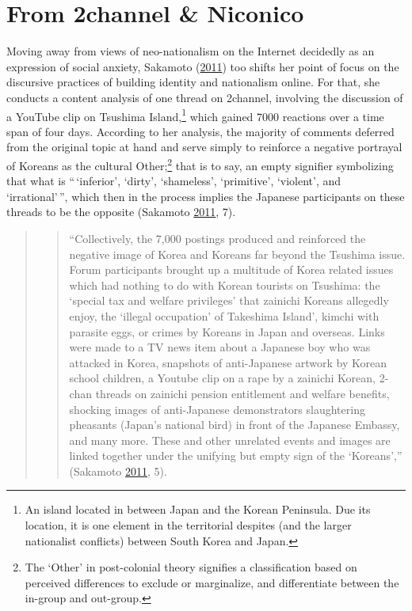 \documentclass[10pt,british,A4paper,,openany]{memoir}
\begin{document}
\section{From 2channel \& Niconico}\label{from-2channel-niconico}

Moving away from views of neo-nationalism on the Internet decidedly as
an expression of social anxiety, Sakamoto
(\protect\hyperlink{ref-sakamoto_koreans_2011}{2011}) too shifts her
point of focus on the discursive practices of building identity and
nationalism online. For that, she conducts a content analysis of one
thread on 2channel, involving the discussion of a YouTube clip on
Tsushima Island,\footnote{An island located in between Japan and the
  Korean Peninsula. Due its location, it is one element in the
  territorial despites (and the larger nationalist conflicts) between
  South Korea and Japan.} which gained 7000 reactions over a time span
of four days. According to her analysis, the majority of comments
deferred from the original topic at hand and serve simply to reinforce a
negative portrayal of Koreans as the cultural Other;\footnote{The
  `Other' in post-colonial theory signifies a classification based on
  perceived differences to exclude or marginalize, and differentiate
  between the in-group and out-group.} that is to say, an empty
signifier symbolizing that what is ``\,`inferior', `dirty', `shameless',
`primitive', `violent', and `irrational'\,'', which then in the process
implies the Japanese participants on these threads to be the opposite
(Sakamoto \protect\hyperlink{ref-sakamoto_koreans_2011}{2011}, 7).

\begin{quote}
\begin{quote}
``Collectively, the 7,000 postings produced and reinforced the negative
image of Korea and Koreans far beyond the Tsushima issue. Forum
participants brought up a multitude of Korea related issues which had
nothing to do with Korean tourists on Tsushima: the `special tax and
welfare privileges' that zainichi Koreans allegedly enjoy, the `illegal
occupation' of Takeshima Island', kimchi with parasite eggs, or crimes
by Koreans in Japan and overseas. Links were made to a TV news item
about a Japanese boy who was attacked in Korea, snapshots of
anti-Japanese artwork by Korean school children, a Youtube clip on a
rape by a zainichi Korean, 2-chan threads on zainichi pension
entitlement and welfare benefits, shocking images of anti-Japanese
demonstrators slaughtering pheasants (Japan's national bird) in front of
the Japanese Embassy, and many more. These and other unrelated events
and images are linked together under the unifying but empty sign of the
`Koreans','' (Sakamoto
\protect\hyperlink{ref-sakamoto_koreans_2011}{2011}, 5).
\end{quote}
\end{quote}
\end{document}
